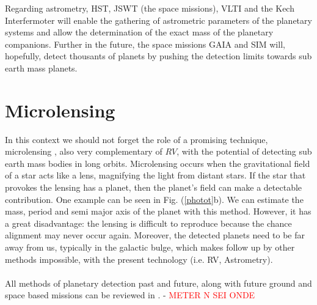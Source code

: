 \documentclass[dvips,12pt,a4paper]{report}
\begin{document}
Regarding astrometry, HST, JSWT (the space missions), VLTI and the Kech Interfermoter will enable the gathering of astrometric parameters of the planetary systems and allow the determination of the exact mass of the planetary companions. Further in the future, the space missions GAIA and SIM will, hopefully, detect thousants of planets by pushing the detection limits towards sub earth mass planets.



\section{Microlensing} 
\label{microlens}
\indent In this context we should not forget the role of a promising technique, microlensing \citep{Beaulieu-2006}, also very complementary of $RV$, with the potential of detecting sub earth mass bodies in long orbits. Microlensing occurs when the gravitational field of a star acts like a lens, magnifying the light from distant stars. If the star that provokes the lensing has a planet, then the planet's field can make a detectable contribution. One example can be seen in Fig. (\ref{photot}b). We can estimate the mass, period and semi major axis of the planet with this method. However, it has a great disadvantage: the lensing is difficult to reproduce because the chance alignment may never occur again. Moreover, the detected planets need to be far away from us, typically in the galactic bulge, which makes follow up by other methods impossible, with the present technology (i.e. RV, Astrometry).
\\
\\
All methods of planetary detection past and future, along with future ground and space based missions can be reviewed in \citet{Perryman-2005}. - \textcolor{red}{METER N SEI ONDE}







\end{document}
